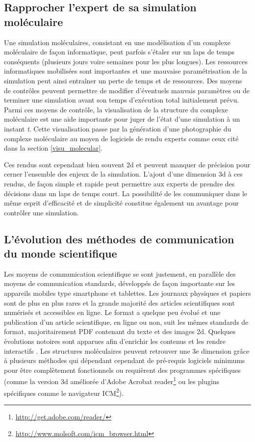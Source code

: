 \subsection{Rapprocher l'expert de sa simulation moléculaire}

Une simulation moléculaires, consistant en une modélisation d'un complexe moléculaire de façon informatique, peut parfois s'étaler sur un laps de temps conséquents (plusieurs jours voire semaines pour les plus longues). Les ressources informatiques mobilisées sont importantes et une mauvaise paramétrisation de la simulation peut ainsi entraîner un perte de temps et de ressources. Des moyens de contrôles peuvent permettre de modifier d'éventuels mauvais paramètres ou de terminer une simulation avant son temps d'exécution total initialement prévu. Parmi ces moyens de contrôle, la visualisation de la structure du complexe moléculaire est une aide importante pour juger de l'état d'une simulation à un instant \textit{t}.
Cette visualisation passe par la génération d'une photographie du complexe moléculaire au moyen de logiciels de rendu experts comme ceux cité dans la section \ref{visu_molecular}.

Ces rendus sont cependant bien souvent 2d et peuvent manquer de précision pour cerner l'ensemble des enjeux de la simulation. L'ajout d'une dimension 3d à ces rendus, de façon simple et rapide peut permettre aux experts de prendre des décisions dans un laps de temps court. La possibilité de les communiquer dans le même esprit d'efficacité et de simplicité constitue également un avantage pour contrôler une simulation.

\subsection{L'évolution des méthodes de communication du monde scientifique}

Les moyens de communication scientifique se sont justement, en parallèle des moyens de communication standards, développés de façon importante sur les appareils mobiles type smartphone et tablettes. Les journaux physiques et papiers sont de plus en plus rares et la grande majorité des articles scientifiques sont numérisés et accessibles en ligne. Le format a quelque peu évolué et une publication d'un article scientifique, en ligne ou non, suit les mêmes standards de format, majoritairement PDF contenant du texte et des images 2d. Quelques évolutions notoires sont apparues afin d'enrichir les contenus et les rendre interactifs \cite{attwood2010utopia}. Les structures moléculaires peuvent retrouver une 3e dimension grâce à plusieurs méthodes \cite{kumar2008grasping,raush2009new} qui dépendant cependant de pré-requis logiciels minimums pour être complètement fonctionnels ou requièrent des programmes spécifiques (comme la version 3d améliorée d'Adobe Acrobat reader\footnote{\url{http://get.adobe.com/reader/}} ou les plugins spécifiques comme le navigateur ICM\footnote{\url{http://www.molsoft.com/icm_browser.html}}).

